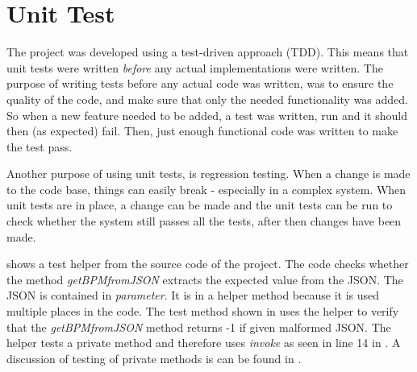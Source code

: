 \section{Unit Test}

The project was developed using a test-driven approach (TDD). This means that unit tests were written \textit{before} any actual implementations were written. The purpose of writing tests before any actual code was written, was to ensure the quality of the code, and make sure that only the needed functionality was added. So when a new feature needed to be added, a test was written, run and it should then (as expected) fail. Then, just enough functional code was written to make the test pass. 

Another purpose of using unit tests, is regression testing. When a change is made to the code base, things can easily break - especially in a complex system. When unit tests are in place, a change can be made and the unit tests can be run to check whether the system still passes all the tests, after then changes have been made. 

 shows a test helper from the source code of the project. The code checks whether the method \textit{getBPMfromJSON} extracts the expected value from the JSON. The JSON is contained in \textit{parameter}. It is in a helper method because it is used multiple places in the code. The test method shown in  uses the helper to verify that the \textit{getBPMfromJSON} method returns -1 if given malformed JSON. The helper tests a private method and therefore uses \textit{invoke} as seen in line 14 in . A discussion of testing of private methods is can be found in .

